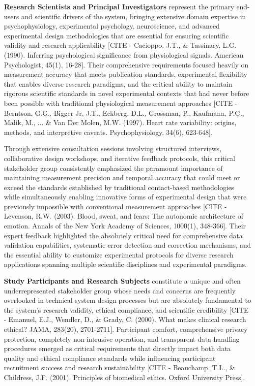 \documentclass[12pt,a4paper]{article}
\begin{document}
\textbf{Research Scientists and Principal Investigators} represent the primary end-users and scientific drivers of the
system, bringing extensive domain expertise in psychophysiology, experimental psychology, neuroscience, and advanced
experimental design methodologies that are essential for ensuring scientific validity and research
applicability [CITE - Cacioppo, J.T., \& Tassinary, L.G. (1990). Inferring psychological significance from physiological signals. American Psychologist, 45(1), 16-28].
Their comprehensive requirements focused heavily on measurement accuracy that meets publication standards, experimental
flexibility that enables diverse research paradigms, and the critical ability to maintain rigorous scientific standards
in novel experimental contexts that had never before been possible with traditional physiological measurement
approaches [CITE - Berntson, G.G., Bigger Jr, J.T., Eckberg, D.L., Grossman, P., Kaufmann, P.G., Malik, M., ... \& Van Der Molen, M.W. (1997). Heart rate variability: origins, methods, and interpretive caveats. Psychophysiology, 34(6), 623-648].

Through extensive consultation sessions involving structured interviews, collaborative design workshops, and iterative
feedback protocols, this critical stakeholder group consistently emphasized the paramount importance of maintaining
measurement precision and temporal accuracy that could meet or exceed the standards established by traditional
contact-based methodologies while simultaneously enabling innovative forms of experimental design that were previously
impossible with conventional measurement
approaches [CITE - Levenson, R.W. (2003). Blood, sweat, and fears: The autonomic architecture of emotion. Annals of the New York Academy of Sciences, 1000(1), 348-366].
Their expert feedback highlighted the absolutely critical need for comprehensive data validation capabilities,
systematic error detection and correction mechanisms, and the essential ability to customize experimental protocols for
diverse research applications spanning multiple scientific disciplines and experimental paradigms.

\textbf{Study Participants and Research Subjects} constitute a unique and often underrepresented stakeholder group whose
needs and concerns are frequently overlooked in technical system design processes but are absolutely fundamental to the
system's research validity, ethical compliance, and scientific
credibility [CITE - Emanuel, E.J., Wendler, D., \& Grady, C. (2000). What makes clinical research ethical? JAMA, 283(20), 2701-2711].
Participant comfort, comprehensive privacy protection, completely non-intrusive operation, and transparent data handling
procedures emerged as critical requirements that directly impact both data quality and ethical compliance standards
while influencing participant recruitment success and research
sustainability [CITE - Beauchamp, T.L., \& Childress, J.F. (2001). Principles of biomedical ethics. Oxford University Press].
\end{document}
